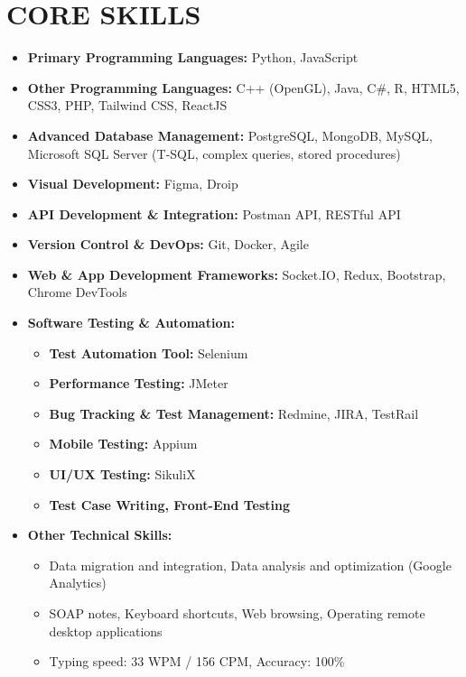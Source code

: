 \documentclass[a4paper,12pt]{article}
\begin{document}
\section*{CORE SKILLS}
\begin{itemize}[label=-]
    \item \textbf{Primary Programming Languages:} Python, JavaScript
    \item \textbf{Other Programming Languages:} C++ (OpenGL), Java, C\#, R, HTML5, CSS3, PHP, Tailwind CSS, ReactJS
    \item \textbf{Advanced Database Management:} PostgreSQL, MongoDB, MySQL, Microsoft SQL Server (T-SQL, complex queries, stored procedures)
    \item \textbf{Visual Development:} Figma, Droip
    \item \textbf{API Development \& Integration:} Postman API, RESTful API
    \item \textbf{Version Control \& DevOps:} Git, Docker, Agile
    \item \textbf{Web \& App Development Frameworks:} Socket.IO, Redux, Bootstrap, Chrome DevTools
    \item \textbf{Software Testing \& Automation:}  
    \begin{itemize}
        \item \textbf{Test Automation Tool:} Selenium
        \item \textbf{Performance Testing:} JMeter
        \item \textbf{Bug Tracking \& Test Management:} Redmine, JIRA, TestRail
        \item \textbf{Mobile Testing:} Appium
        \item \textbf{UI/UX Testing:} SikuliX
        \item \textbf{Test Case Writing, Front-End Testing}
    \end{itemize}
    \item \textbf{Other Technical Skills:}
    \begin{itemize}
        \item Data migration and integration, Data analysis and optimization (Google Analytics)
        \item SOAP notes, Keyboard shortcuts, Web browsing, Operating remote desktop applications
        \item Typing speed: 33 WPM / 156 CPM, Accuracy: 100\%
    \end{itemize}
\end{itemize}
\end{document}
